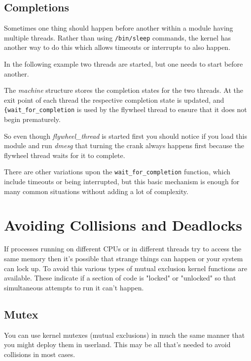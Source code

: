 \documentclass[10pt, oneside]{book}
\begin{document}


\subsection{Completions}
\label{sec:completion}
Sometimes one thing should happen before another within a module having multiple threads.
Rather than using \verb|/bin/sleep| commands, the kernel has another way to do this which allows timeouts or interrupts to also happen.

In the following example two threads are started, but one needs to start before another.


The \emph{machine} structure stores the completion states for the two threads.
At the exit point of each thread the respective completion state is updated, and \verb|{wait_for_completion| is used by the flywheel thread to ensure that it does not begin prematurely.

So even though \emph{flywheel\_thread} is started first you should notice if you load this module and run \emph{dmesg} that turning the crank always happens first because the flywheel thread waits for it to complete.

There are other variations upon the \verb|wait_for_completion| function, which include timeouts or being interrupted, but this basic mechanism is enough for many common situations without adding a lot of complexity.

\section{Avoiding Collisions and Deadlocks}
\label{sec:org17fc2e9}
If processes running on different CPUs or in different threads try to access the same memory then it's possible that strange things can happen or your system can lock up. To avoid this various types of mutual exclusion kernel functions are available. These indicate if a section of code is "locked" or "unlocked" so that simultaneous attempts to run it can't happen.
\subsection{Mutex}
\label{sec:org04a65a4}
You can use kernel mutexes (mutual exclusions) in much the same manner that you might deploy them in userland. This may be all that's needed to avoid collisions in most cases.
\end{document}
